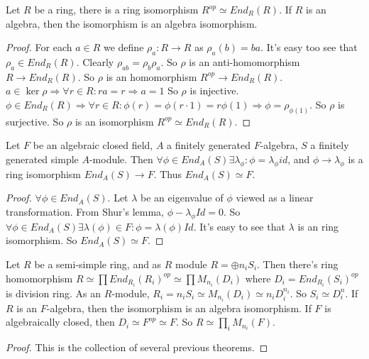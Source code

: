 \documentclass[12pt]{book}
\begin{document}
	\begin{theorem}
		Let $R$ be a ring, there is a ring isomorphism $R^{op}\simeq End_R(R)$. If $R$ is an algebra, then the isomorphism is an algebra isomorphism.
	\end{theorem}
	\begin{proof}
		For each $a\in R$ we define $\rho_a:R\rightarrow R$ as $\rho_a(b)=ba$. It's easy too see that $\rho_a\in End_R(R)$. Clearly $\rho_{ab}=\rho_b\rho_a$. So $\rho$ is an anti-homomorphism $R\rightarrow End_R(R)$. So $\rho$ is an homomorphism $R^{op}\rightarrow End_R(R)$. $a\in\ker\rho\Rightarrow\forall r\in R:ra=r\Rightarrow a=1$ So $\rho$ is injective. $\phi\in  End_R(R)\Rightarrow \forall r\in R :\phi(r)=\phi(r\cdot 1)=r\phi(1)\Rightarrow \phi=\rho_{\phi(1)}$. So $\rho$ is surjective. So $\rho$ is an isomorphism $R^{op}\simeq End_R(R)$.
	\end{proof}
	
	\begin{theorem}
		Let $F$ be an algebraic closed field, $A$ a finitely generated $F$-algebra, $S$ a finitely generated simple $A$-module. Then $\forall \phi \in End_A(S)\exists \lambda_\phi: \phi=\lambda_\phi id$, and $\phi\rightarrow \lambda_\phi$ is a ring isomorphism $End_A(S)\rightarrow F$. Thus $End_A(S)\simeq F$.
		\label{thm:schur_id}
	\end{theorem}
	\begin{proof}
		$\forall \phi \in End_A(S)$. Let $\lambda$ be an eigenvalue of $\phi$ viewed as a linear transformation. From Shur's lemma, $\phi-\lambda_\phi Id=0$. So $\forall \phi \in End_A(S)\exists \lambda(\phi)\in F:\phi=\lambda(\phi) Id$. It's easy to see that $\lambda$ is an ring isomorphism. So $End_A(S)\simeq F$.
	\end{proof}
		
	\begin{theorem}[Wedderburn]
		Let $R$ be a semi-simple ring, and as $R$ module $R=\oplus n_iS_i$. Then there's ring homomorphism $R\simeq\prod  End_{R_i}(R_i)^{op}\simeq\prod M_{n_i}(D_i)$  where $D_i=End_{R_i}(S_i)^{op}$ is division ring. As an $R$-module, $R_i=n_iS_i\simeq M_{n_i}(D_i)\simeq n_i D_i^{n_i}$. So $S_i\simeq D_i^n$. If $R$ is an $F$-algebra, then the isomorphism is an algebra isomorphism.  If $F$ is algebraically closed, then $D_i\simeq F^{op}\simeq F$. So $R\simeq \prod_i M_{n_i}(F)$.
	\end{theorem}
	\begin{proof}
		This is the collection of several previous theorems.
	\end{proof}
	
\end{document}
